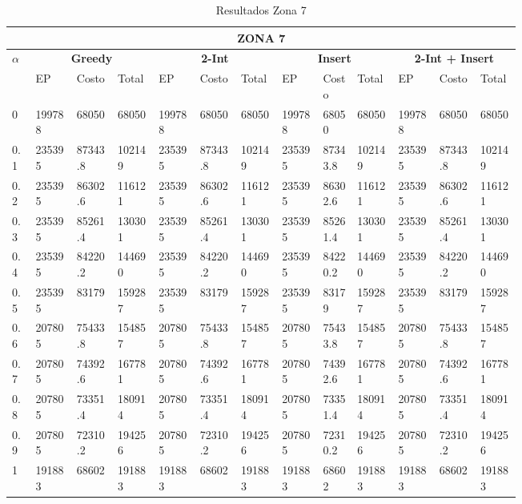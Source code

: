 \documentclass[conference]{IEEEtran}
\begin{document}
\clearpage
\begin{table*}[t]
\caption{Resultados Zona 7}
\centering
\begin{tabular}{|p{0.03\linewidth}|p{0.06\linewidth}|p{0.06\linewidth}|p{0.06\linewidth}|p{0.06\linewidth}|p{0.06\linewidth}|p{0.06\linewidth}|p{0.06\linewidth}|p{0.05\linewidth}|p{0.06\linewidth}|p{0.06\linewidth}|p{0.06\linewidth}|p{0.06\linewidth}|}
\hline
\multicolumn{13}{|c|}{\textbf{ZONA 7}} \\ 
\hline

\multirow{2}{*}{\textbf{$\alpha$}}  & \multicolumn{3}{|c|}{\textbf{Greedy}} & \multicolumn{3}{|c|}{\textbf{2-Int}} & \multicolumn{3}{|c|}{\textbf{Insert}} & \multicolumn{3}{|c|}{\textbf{2-Int + Insert}} \\

\cline{2-13}
 & EP & Costo & Total & EP & Costo & Total & EP & Costo & Total & EP & Costo & Total  \\
\hline
0 & 199788 & 68050 & 68050 & 199788 & 68050 & 68050 & 199788 & 68050 & 68050 & 199788 & 68050 & 68050  \\
\hline

0.1 & 235395 & 87343.8 & 102149 & 235395 & 87343.8 & 102149 & 235395 & 87343.8 & 102149 & 235395 & 87343.8 & 102149  \\
\hline

0.2 & 235395 & 86302.6 & 116121 & 235395 & 86302.6 & 116121 & 235395 & 86302.6 & 116121 & 235395 & 86302.6 & 116121  \\
\hline

0.3 & 235395 & 85261.4 & 130301 & 235395 & 85261.4 & 130301 & 235395 & 85261.4 & 130301 & 235395 & 85261.4 & 130301  \\
\hline

0.4 & 235395 & 84220.2 & 144690 & 235395 & 84220.2 & 144690 & 235395 & 84220.2 & 144690 & 235395 & 84220.2 & 144690  \\
\hline

0.5 & 235395 & 83179 & 159287 & 235395 & 83179 & 159287 & 235395 & 83179 & 159287 & 235395 & 83179 & 159287  \\
\hline

0.6 & 207805 & 75433.8 & 154857 & 207805 & 75433.8 & 154857 & 207805 & 75433.8 & 154857 & 207805 & 75433.8 & 154857  \\
\hline

0.7 & 207805 & 74392.6 & 167781 & 207805 & 74392.6 & 167781 & 207805 & 74392.6 & 167781 & 207805 & 74392.6 & 167781  \\
\hline

0.8 & 207805 & 73351.4 & 180914 & 207805 & 73351.4 & 180914 & 207805 & 73351.4 & 180914 & 207805 & 73351.4 & 180914  \\
\hline

0.9 & 207805 & 72310.2 & 194256 & 207805 & 72310.2 & 194256 & 207805 & 72310.2 & 194256 & 207805 & 72310.2 & 194256  \\
\hline

1 & 191883 & 68602 & 191883 & 191883 & 68602 & 191883 & 191883 & 68602 & 191883 & 191883 & 68602 & 191883  \\
\hline


\end{tabular}
\end{table*}
\end{document}
